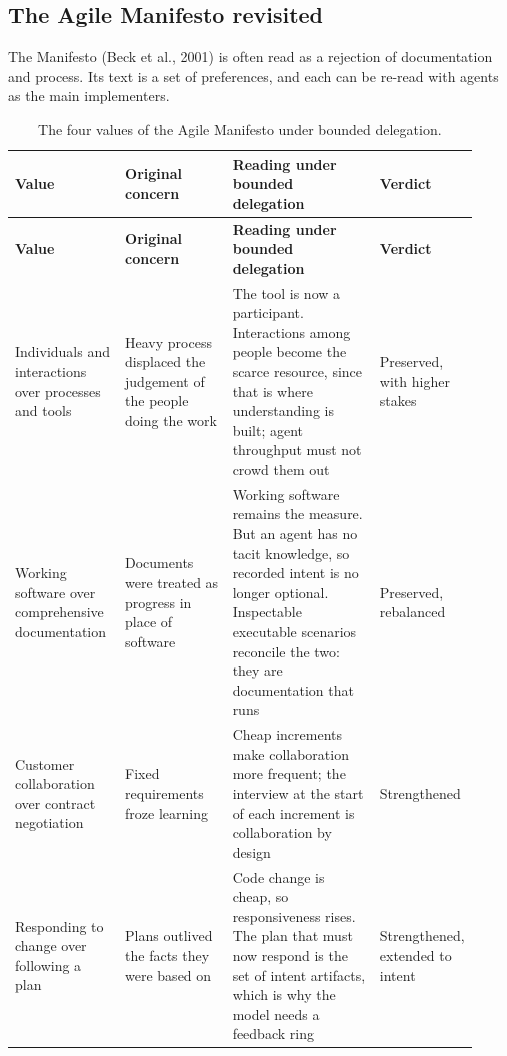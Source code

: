 \documentclass[11pt]{article}
\begin{document}
\subsection{The Agile Manifesto revisited}

The Manifesto (Beck et al., 2001) is often read as a rejection of documentation and process. Its text is a set of preferences, and each can be re-read with agents as the main implementers.

\small
\begin{longtable}{p{0.24\linewidth}p{0.24\linewidth}p{0.34\linewidth}p{0.1\linewidth}}
\caption{The four values of the Agile Manifesto under bounded delegation.}\label{tab:manifesto}\\
\toprule
\textbf{Value} & \textbf{Original concern} & \textbf{Reading under bounded delegation} & \textbf{Verdict} \\
\midrule
\endfirsthead
\toprule
\textbf{Value} & \textbf{Original concern} & \textbf{Reading under bounded delegation} & \textbf{Verdict} \\
\midrule
\endhead
Individuals and interactions over processes and tools & Heavy process displaced the judgement of the people doing the work & The tool is now a participant. Interactions among people become the scarce resource, since that is where understanding is built; agent throughput must not crowd them out & Preserved, with higher stakes \\
Working software over comprehensive documentation & Documents were treated as progress in place of software & Working software remains the measure. But an agent has no tacit knowledge, so recorded intent is no longer optional. Inspectable executable scenarios reconcile the two: they are documentation that runs & Preserved, rebalanced \\
Customer collaboration over contract negotiation & Fixed requirements froze learning & Cheap increments make collaboration more frequent; the interview at the start of each increment is collaboration by design & Strengthened \\
Responding to change over following a plan & Plans outlived the facts they were based on & Code change is cheap, so responsiveness rises. The plan that must now respond is the set of intent artifacts, which is why the model needs a feedback ring & Strengthened, extended to intent \\
\bottomrule
\end{longtable}
\normalsize
\end{document}
